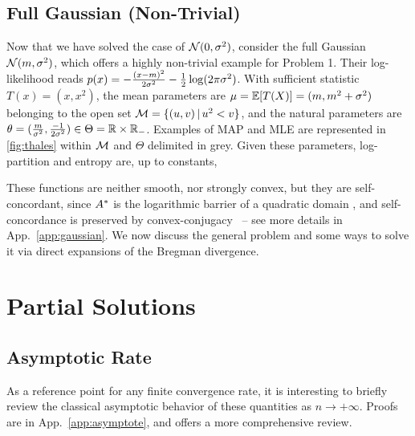 \subsection{Full Gaussian (Non-Trivial)}
\label{ssec:gaussian}
Now that we have solved the case of ${\mathcal N}(0,\sigma^2)$, consider the full Gaussian ${\mathcal N}(m,\sigma^2)$, which offers a highly non-trivial example for Problem 1.
Their log-likelihood reads $p(x) = -\frac{(x-m)^2}{2 \sigma^2} - \frac{1}{2} \log(2\pi\sigma^2)$.
With sufficient statistic $T(x)=(x, x^2)$,
the mean parameters are $\mu = \operatorname{\mathbb{E}}[T(X)] = (m , m^2 + \sigma^2)$ belonging to the open set ${\mathcal M}= \{(u,v) \,\vert\, u^2 < v\}$,
and the natural parameters are $\theta= (\frac{m}{\sigma^2} , \frac{-1}{2\sigma^2}) \in \Theta = \mathbb{R} \times \mathbb{R}_-$.
Examples of MAP and MLE  are represented in \cref{fig:thales} within ${\mathcal M}$ and $\Theta$ delimited in grey.
Given these parameters, log-partition and entropy are, up to constants,

These functions are neither smooth, nor strongly convex, but they are self-concordant, since ${A^*}$ is  the logarithmic barrier of a quadratic domain
\citep[p.177, example 4.1.1.4]{nesterov2003introductory}, and self-concordance is preserved by convex-conjugacy~\citep{nesterov1994interior} -- see more details in App.~\ref{app:gaussian}.
We now discuss the general problem and some ways to solve it via direct expansions of the Bregman divergence.

\section{Partial Solutions}
\label{sec:insights}

\subsection{Asymptotic Rate}
\label{ssec:asymptote}
As a reference point for any finite convergence rate, it is interesting to briefly review the classical asymptotic behavior of these quantities as $n \rightarrow +\infty$.
Proofs are in App.~\ref{app:asymptote}, and \citet[\S1.1]{ostrovskii2021finite} offers a more comprehensive review.

